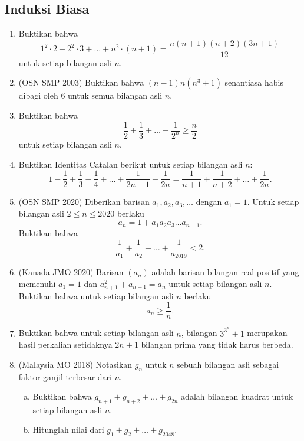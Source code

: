 \documentclass[12pt]{scrartcl}
\begin{document}
\subsection{Induksi Biasa}
\begin{enumerate}

	\item 
	Buktikan bahwa
	\[ 1^2 \cdot 2 + 2^2 \cdot 3 + \dots + n^2 \cdot (n+1)
	= \frac{n(n+1)(n+2)(3n+1)}{12} \]
	untuk setiap bilangan asli $n$.

	\item (OSN SMP 2003)
	Buktikan bahwa $(n-1)n(n^3+1)$ senantiasa habis dibagi oleh $6$
	untuk semua bilangan asli $n$.

	\item 
	Buktikan bahwa
	\[ \frac{1}{2} + \frac{1}{3} + \dots + \frac{1}{2^n} \ge \frac{n}{2} \]
	untuk setiap bilangan asli $n$.

	\item 
	Buktikan Identitas Catalan berikut untuk setiap bilangan asli $n$:
	\[ 1 - \frac{1}{2} + \frac{1}{3} - \frac{1}{4} + \dots
	+ \frac{1}{2n-1} - \frac{1}{2n}
	= \frac{1}{n+1} + \frac{1}{n+2} + \dots + \frac{1}{2n}. \]

	\item (OSN SMP 2020)
	Diberikan barisan $a_1, a_2, a_3, \dots$ dengan $a_1 = 1$.
	Untuk setiap bilangan asli $2 \le n \le 2020$ berlaku
	\[ a_n = 1 + a_1 a_2 a_3 \dots a_{n-1}. \]
	Buktikan bahwa
	\[ \frac{1}{a_1} + \frac{1}{a_2} + \dots + \frac{1}{a_{2019}} < 2. \]

	\item (Kanada JMO 2020)
	Barisan $(a_n)$ adalah barisan bilangan real positif yang memenuhi
	$a_1 = 1$ dan $a_{n+1}^2 + a_{n+1} = a_n$ untuk setiap bilangan asli $n$.
	Buktikan bahwa untuk setiap bilangan asli $n$ berlaku
	\[ a_n \ge \frac{1}{n}. \]

	\item 
	Buktikan bahwa untuk setiap bilangan asli $n$,
	bilangan $3^{3^n} + 1$ merupakan hasil perkalian setidaknya $2n+1$
	bilangan prima yang tidak harus berbeda.

	\item (Malaysia MO 2018)
	Notasikan $g_n$ untuk $n$ sebuah bilangan asli sebagai faktor ganjil terbesar dari $n$.
	\begin{enumerate}[(a)]
		\item Buktikan bahwa $g_{n+1} + g_{n+2} + \dots + g_{2n}$
		adalah bilangan kuadrat untuk setiap bilangan asli $n$.
		\item Hitunglah nilai dari $g_1 + g_2 + \dots + g_{2048}$.
	\end{enumerate}


\end{enumerate}
\end{document}
